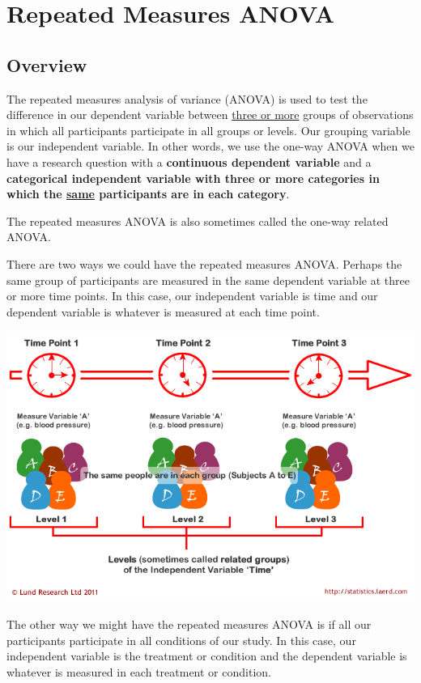 \documentclass[
]{book}
\begin{document}
\hypertarget{repeated-measures-anova}{%
\section{Repeated Measures ANOVA}\label{repeated-measures-anova}}

\hypertarget{overview-7}{%
\subsection{Overview}\label{overview-7}}

The repeated measures analysis of variance (ANOVA) is used to test the difference in our dependent variable between \underline{three or more} groups of observations in which all participants participate in all groups or levels. Our grouping variable is our independent variable. In other words, we use the one-way ANOVA when we have a research question with a \textbf{continuous dependent variable} and a \textbf{categorical independent variable with three or more categories in which the \underline{same} participants are in each category}.

The repeated measures ANOVA is also sometimes called the one-way related ANOVA.

There are two ways we could have the repeated measures ANOVA. Perhaps the same group of participants are measured in the same dependent variable at three or more time points. In this case, our independent variable is time and our dependent variable is whatever is measured at each time point.

\includegraphics{images/05-repeated-measures-anova/Laerd1.png}

The other way we might have the repeated measures ANOVA is if all our participants participate in all conditions of our study. In this case, our independent variable is the treatment or condition and the dependent variable is whatever is measured in each treatment or condition.
\end{document}
